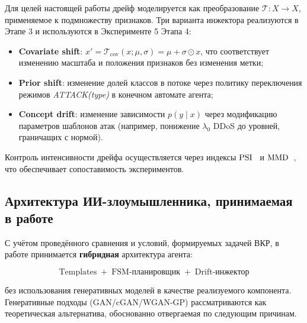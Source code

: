 Для целей настоящей работы дрейф моделируется как преобразование
\(\mathcal{T}\colon X \to X\), применяемое к подмножеству признаков. Три
варианта инжектора реализуются в Этапе 3 и используются в Эксперименте 5
Этапа 4:

\begin{itemize}
    \item \textbf{Covariate shift}:
    \(x' = \mathcal{T}_{\text{cov}}(x; \mu, \sigma) = \mu + \sigma \odot x\),
    что соответствует изменению масштаба и положения признаков без
    изменения метки;
    \item \textbf{Prior shift}: изменение долей классов в потоке
    через политику переключения режимов \emph{ATTACK(type)} в
    конечном автомате агента;
    \item \textbf{Concept drift}: изменение зависимости \(p(y \mid x)\)
    через модификацию параметров шаблонов атак (например, понижение
    \(\lambda_0\) DDoS до уровней, граничащих с нормой).
\end{itemize}

Контроль интенсивности дрейфа осуществляется через индексы
\(\operatorname{PSI}\)~ и \(\operatorname{MMD}\)~, что обеспечивает
сопоставимость экспериментов.

\subsection{Архитектура ИИ-злоумышленника, принимаемая в работе}

С учётом проведённого сравнения и условий, формируемых задачей ВКР, в работе
принимается \textbf{гибридная} архитектура агента:

\[
\boxed{\;\text{Templates} \;+\; \text{FSM-планировщик} \;+\; \text{Drift-инжектор}\;}
\]

\noindent без использования генеративных моделей в качестве реализуемого
компонента. Генеративные подходы (GAN/cGAN/WGAN-GP) рассматриваются как
теоретическая альтернатива, обоснованно отвергаемая по следующим причинам.

